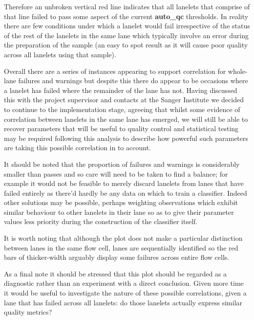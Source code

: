 Therefore an unbroken vertical red line indicates that all lanelets that
comprise of that line failed to pass some aspect of the current
\textbf{auto\_qc} thresholds. In reality there are few conditions under which
a lanelet would fail irrespective of the status of the rest of the lanelets in
the same lane which typically involve an error during the preparation of the
sample (an easy to spot result as it will cause poor quality across all lanelets
using that sample).

Overall there are a series of instances appearing to support correlation for
whole-lane failures and warnings but despite this there do appear to be occasions
where a lanelet has failed where the remainder of the lane has not.
Having discussed this with the project supervisor and contacts at the Sanger Institute we decided to continue to
the implementation stage, agreeing that whilst some evidence of correlation
between lanelets in the same lane has emerged, we will still be able to recover
parameters that will be useful to quality control and statistical testing may be
required following this analysis to describe how powerful such parameters are
taking this possible correlation in to account.

It should be
noted that the proportion of failures and warnings is considerably smaller than
passes and so care will need to be taken to find a balance; for example it would
not be feasible to merely discard lanelets from lanes that have failed entirely
as there'd hardly be any data on which to train a classifier. Indeed other
solutions may be possible, perhaps weighting observations which exhibit similar
behaviour to other lanelets in their lane so as to give their parameter values
less priority during the construction of the classifier itself.

It is worth noting that although the plot does not make a particular
distinction between lanes in the same flow cell, lanes are sequentially
identified so the red bars of thicker-width arguably display some failures
across entire flow cells.

As a final note it should be stressed that this plot should be regarded as a
diagnostic rather than an experiment with a direct conclusion. Given more time it
would be useful to investigate the nature of these possible correlations, given
a lane that has failed across all lanelets: do those lanelets actually express
similar quality metrics?

